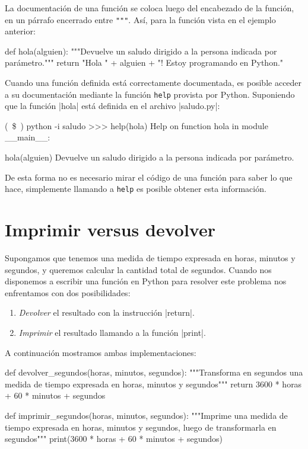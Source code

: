 La documentación de una función se coloca luego del encabezado de la función,
en un párrafo encerrado entre \lstinline!"""!.  Así, para la función vista en
el ejemplo anterior:

\begin{codigo-python-sn}
def hola(alguien):
    """Devuelve un saludo dirigido a la persona indicada por parámetro."""
    return "Hola " + alguien + "! Estoy programando en Python."
\end{codigo-python-sn}

\begin{sabias_que}
Cuando una función definida está correctamente documentada, es posible acceder
a su documentación mediante la función \lstinline!help! provista por Python.
Suponiendo que la función |hola| está definida en el archivo |saludo.py|:

\begin{codigo-python-sn}
(~\$~) python -i saludo
>>> help(hola)
Help on function hola in module __main__:

hola(alguien)
    Devuelve un saludo dirigido a la persona indicada por parámetro.
\end{codigo-python-sn}

De esta forma no es necesario mirar el código de una función para saber lo que
hace, simplemente llamando a \lstinline!help! es posible obtener esta
información.
\end{sabias_que}

\section{Imprimir versus devolver}

Supongamos que tenemos una medida de tiempo expresada en horas, minutos y
segundos, y queremos calcular la cantidad total de segundos. Cuando nos
disponemos a escribir una función en Python para resolver este problema nos
enfrentamos con dos posibilidades:

\begin{enumerate}
\item \emph{Devolver} el resultado con la instrucción |return|.
\item \emph{Imprimir} el resultado llamando a la función |print|.
\end{enumerate}

A continuación mostramos ambas implementaciones:

\begin{codigo-python-sn}
def devolver_segundos(horas, minutos, segundos):
    """Transforma en segundos una medida de tiempo expresada en
       horas, minutos y segundos"""
    return 3600 * horas + 60 * minutos + segundos

def imprimir_segundos(horas, minutos, segundos):
    """Imprime una medida de tiempo expresada en horas, minutos y
       segundos, luego de transformarla en segundos"""
    print(3600 * horas + 60 * minutos + segundos)
\end{codigo-python-sn}

